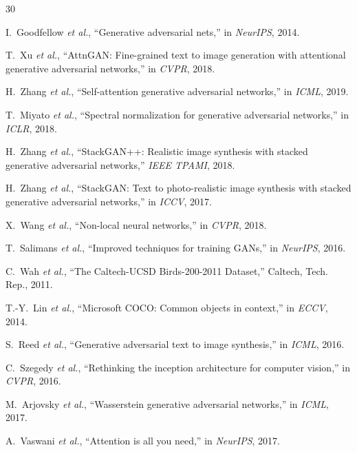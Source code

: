 \documentclass[conference]{IEEEtran}
\begin{document}
\begin{thebibliography}{30}

I.~Goodfellow \textit{et al.}, ``Generative adversarial nets,'' in \textit{NeurIPS}, 2014.

T.~Xu \textit{et al.}, ``AttnGAN: Fine-grained text to image generation with attentional generative adversarial networks,'' in \textit{CVPR}, 2018.

H.~Zhang \textit{et al.}, ``Self-attention generative adversarial networks,'' in \textit{ICML}, 2019.

T.~Miyato \textit{et al.}, ``Spectral normalization for generative adversarial networks,'' in \textit{ICLR}, 2018.

H.~Zhang \textit{et al.}, ``StackGAN++: Realistic image synthesis with stacked generative adversarial networks,'' \textit{IEEE TPAMI}, 2018.

H.~Zhang \textit{et al.}, ``StackGAN: Text to photo-realistic image synthesis with stacked generative adversarial networks,'' in \textit{ICCV}, 2017.

X.~Wang \textit{et al.}, ``Non-local neural networks,'' in \textit{CVPR}, 2018.

T.~Salimans \textit{et al.}, ``Improved techniques for training GANs,'' in \textit{NeurIPS}, 2016.

C.~Wah \textit{et al.}, ``The Caltech-UCSD Birds-200-2011 Dataset,'' Caltech, Tech. Rep., 2011.

T.-Y.~Lin \textit{et al.}, ``Microsoft COCO: Common objects in context,'' in \textit{ECCV}, 2014.

S.~Reed \textit{et al.}, ``Generative adversarial text to image synthesis,'' in \textit{ICML}, 2016.

C.~Szegedy \textit{et al.}, ``Rethinking the inception architecture for computer vision,'' in \textit{CVPR}, 2016.

M.~Arjovsky \textit{et al.}, ``Wasserstein generative adversarial networks,'' in \textit{ICML}, 2017.

A.~Vaswani \textit{et al.}, ``Attention is all you need,'' in \textit{NeurIPS}, 2017.


\end{thebibliography}
\end{document}
